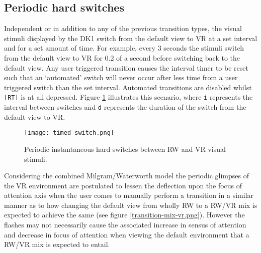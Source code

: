 


\subsection{Periodic hard switches}
\label{subsub-periodic}
Independent or in addition to any of the previous transition types, the visual stimuli displayed by the DK1 switch from the default view to VR at a set interval and for a set amount of time. For example, every 3 seconds the stimuli switch from the default view to VR for 0.2 of a second before switching back to the default view. Any user triggered transition causes the interval timer to be reset such that an `automated' switch will never occur after less time from a user triggered switch than the set interval. Automated transitions are disabled whilst \texttt{[RT]} is at all depressed. Figure \ref{scenariotimed} illustrates this scenario, where \texttt{i} represents the interval between switches and \texttt{d} represents the duration of the switch from the default view to VR.

\begin{figure}[h]
	\begin{center}
		\texttt{[image: timed-switch.png]}
		\caption{Periodic instantaneous hard switches between RW and VR visual stimuli.}
		\label{scenariotimed}
	\end{center}
\end{figure}

Considering the combined Milgram/Waterworth model the periodic glimpses of the VR environment are postulated to lessen the deflection upon the focus of attention axis when the user comes to manually perform a transition in a similar manner as to how changing the default view from wholly RW to a RW/VR mix is expected to achieve the same (see figure \ref{transition-mix-vr.png}). However the flashes may not necessarily cause the associated increase in sensus of attention and decrease in focus of attention when viewing the default environment that a RW/VR mix is expected to entail.


